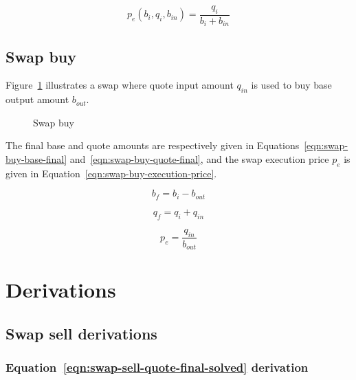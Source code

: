 \documentclass[table, twocolumn]{article}
\begin{document}
\begin{equation}\label{eqn:swap-sell-execution-price-solved}
	p_e (b_i, q_i, b_{in}) = \frac{q_i}{b_i + b_{in}}
\end{equation}

\subsection{Swap buy}\label{ssec:swap-buy}

Figure~\ref{fig:swap-buy} illustrates a swap where quote input amount $q_{in}$ is used
to buy base output amount $b_{out}$.

\begin{figure}[!htb]
	\centering
	
	\caption{Swap buy}\label{fig:swap-buy}
\end{figure}

The final base and quote amounts are respectively given in
Equations~\ref{eqn:swap-buy-base-final} and~\ref{eqn:swap-buy-quote-final}, and the
swap execution price $p_e$ is given in Equation~\ref{eqn:swap-buy-execution-price}.

\begin{equation}\label{eqn:swap-buy-base-final}
	b_f = b_i - b_{out}
\end{equation}

\begin{equation}\label{eqn:swap-buy-quote-final}
	q_f = q_i + q_{in}
\end{equation}

\begin{equation}\label{eqn:swap-buy-execution-price}
	p_e = \frac{q_{in}}{b_{out}}
\end{equation}

\section{Derivations}\label{sec:derivations}

\subsection{Swap sell derivations}\label{ssec:swap-sell-derivations}

\subsubsection{Equation~\ref{eqn:swap-sell-quote-final-solved} derivation}%
\label{sssec:equation-eqn-swap-sell-quote-final-solved-derivation}
\end{document}
